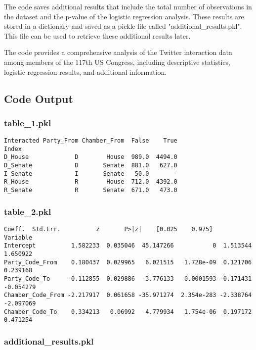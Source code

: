 \documentclass[11pt]{article}
\begin{document}
The code saves additional results that include the total number of observations in the dataset and the p-value of the logistic regression analysis. These results are stored in a dictionary and saved as a pickle file called "additional\_results.pkl". This file can be used to retrieve these additional results later.

The code provides a comprehensive analysis of the Twitter interaction data among members of the 117th US Congress, including descriptive statistics, logistic regression results, and additional information.

\subsection{Code Output}

\subsubsection*{table\_1.pkl}

\begin{Verbatim}[tabsize=4]
Interacted Party_From Chamber_From  False    True
Index
D_House             D        House  989.0  4494.0
D_Senate            D       Senate  881.0   627.0
I_Senate            I       Senate   50.0       -
R_House             R        House  712.0  4392.0
R_Senate            R       Senate  671.0   473.0
\end{Verbatim}

\subsubsection*{table\_2.pkl}

\begin{Verbatim}[tabsize=4]
                     Coeff.  Std.Err.          z       P>|z|    [0.025    0.975]
Variable
Intercept          1.582233  0.035046  45.147266           0  1.513544  1.650922
Party_Code_From    0.180437  0.029965   6.021515   1.728e-09  0.121706  0.239168
Party_Code_To     -0.112855  0.029886  -3.776133   0.0001593 -0.171431 -0.054279
Chamber_Code_From -2.217917  0.061658 -35.971274  2.354e-283 -2.338764 -2.097069
Chamber_Code_To    0.334213   0.06992   4.779934   1.754e-06  0.197172  0.471254
\end{Verbatim}

\subsubsection*{additional\_results.pkl}
\end{document}
